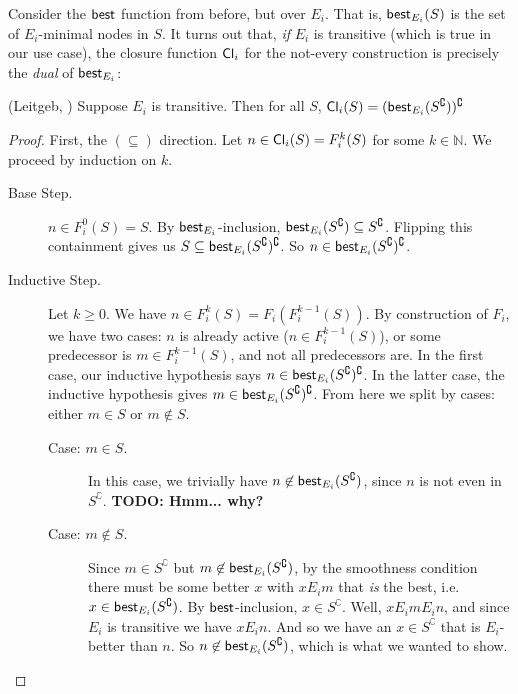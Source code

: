 \documentclass[letterpaper]{article}
\begin{document}
    Consider the $\mathsf{best}$ function from before, but over $E_i$.  That is, $\mathsf{best}_{E_i}(S)$ is the set of $E_i$-minimal nodes in $S$.  It turns out that, \emph{if} $E_i$ is transitive (which is true in our use case), the closure function $\mathsf{Cl}_i$ for the not-every construction is precisely the \emph{dual} of $\mathsf{best}_{E_i}$:
    \begin{claim*} (Leitgeb, \cite{leitgeb2001nonmonotonic})
        Suppose $E_i$ is transitive.  Then for all $S$, $\mathsf{Cl}_i(S) = (\mathsf{best}_{E_i}(S^\complement))^\complement$
    \end{claim*}
    \begin{proof}
        First, the $(\subseteq)$ direction.  Let $n \in \mathsf{Cl}_i(S) = F^k_i(S)$ for some $k \in \mathbb{N}$.  We proceed by induction on $k$.
        \begin{description}
            \item[Base Step.] $n \in F^0_i(S) = S$.  By $\mathsf{best}_{E_i}$-inclusion, $\mathsf{best}_{E_i}(S^\complement) \subseteq S^\complement$. Flipping this containment gives us $S \subseteq \mathsf{best}_{E_i}(S^\complement)^\complement$.  So $n \in \mathsf{best}_{E_i}(S^\complement)^\complement$.
            
            \item[Inductive Step.] Let $k \geq 0$.  We have $n \in F^k_i(S) = F_i(F^{k-1}_i(S))$.  By construction of $F_i$, we have two cases: $n$ is already active ($n \in F^{k-1}_i(S)$), or some predecessor is $m \in F^{k-1}_i(S)$, and not all predecessors are.  In the first case, our inductive hypothesis says $n \in \mathsf{best}_{E_i}(S^\complement)^\complement$.  In the latter case, the inductive hypothesis gives $m \in \mathsf{best}_{E_i}(S^\complement)^\complement$.  From here we split by cases: either $m \in S$ or $m \not \in S$.
            \begin{description}
                \item[Case: $m \in S$.] In this case, we trivially have $n \not \in \mathsf{best}_{E_i}(S^\complement)$, since $n$ is not even in $S^\complement$. \textbf{TODO: Hmm... why?}

                \item[Case: $m \not \in S$.]
                Since $m \in S^\complement$ but $m \not \in \mathsf{best}_{E_i}(S^\complement)$, by the smoothness condition there must be some better $x$ with $x{E_i}m$ that \emph{is} the best, i.e. $x \in \mathsf{best}_{E_i}(S^\complement)$.  By $\mathsf{best}$-inclusion, $x \in S^\complement$.  Well, $x{E_i}m{E_i}n$, and since $E_i$ is transitive we have $x{E_i}n$.  And so we have an $x \in S^\complement$ that is $E_i$-better than $n$.  So $n \not \in \mathsf{best}_{E_i}(S^\complement)$, which is what we wanted to show.
            \end{description}
        \end{description}


\end{proof}
\end{document}
